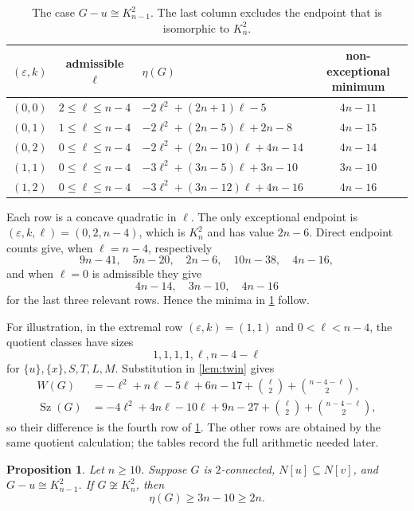 \documentclass[11pt,reqno]{amsart}
\newtheorem{proposition}[proposition]{Proposition}
\theoremstyle{definition}
\theoremstyle{remark}
\newcommand{\Sz}{\operatorname{Sz}}
\begin{document}
\begin{table}[H]
\centering
\caption{The case $G-u\cong K_{n-1}^2$.  The last column excludes the endpoint
that is isomorphic to $K_n^2$.}\label{tab:k2}
\small
\begin{tabular}{@{}c c l c@{}}
\toprule
$(\varepsilon,k)$ & admissible $\ell$ & $\eta(G)$ & non-exceptional minimum \\
\midrule
$(0,0)$ & $2\le\ell\le n-4$
& $-2\ell^2+(2n+1)\ell-5$ & $4n-11$ \\
$(0,1)$ & $1\le\ell\le n-4$
& $-2\ell^2+(2n-5)\ell+2n-8$ & $4n-15$ \\
$(0,2)$ & $0\le\ell\le n-4$
& $-2\ell^2+(2n-10)\ell+4n-14$ & $4n-14$ \\
$(1,1)$ & $0\le\ell\le n-4$
& $-3\ell^2+(3n-5)\ell+3n-10$ & $3n-10$ \\
$(1,2)$ & $0\le\ell\le n-4$
& $-3\ell^2+(3n-12)\ell+4n-16$ & $4n-16$ \\
\bottomrule
\end{tabular}
\end{table}

Each row is a concave quadratic in $\ell$.  The only exceptional endpoint is
$(\varepsilon,k,\ell)=(0,2,n-4)$, which is $K_n^2$ and has value $2n-6$.
Direct endpoint counts give, when $\ell=n-4$, respectively
\[
 9n-41,\quad 5n-20,\quad 2n-6,\quad 10n-38,\quad 4n-16,
\]
and when $\ell=0$ is admissible they give
\[
 4n-14,\quad 3n-10,\quad 4n-16
\]
for the last three relevant rows.  Hence the minima in \cref{tab:k2} follow.

For illustration, in the extremal row $(\varepsilon,k)=(1,1)$ and
$0<\ell<n-4$, the quotient classes have sizes
\[
  1,1,1,1,\ell,n-4-\ell
\]
for $\{u\},\{x\},S,T,L,M$.  Substitution in \cref{lem:twin} gives
\begin{align*}
 W(G)&=-\ell^2+n\ell-5\ell+6n-17
       +\binom{\ell}{2}+\binom{n-4-\ell}{2},\\
 \Sz(G)&=-4\ell^2+4n\ell-10\ell+9n-27
       +\binom{\ell}{2}+\binom{n-4-\ell}{2},
\end{align*}
so their difference is the fourth row of \cref{tab:k2}.  The other rows are
obtained by the same quotient calculation; the tables record the full
arithmetic needed later.

\begin{proposition}\label{prop:k2extension}
Let $n\ge10$.  Suppose $G$ is $2$-connected, $N[u]\subseteq N[v]$, and
$G-u\cong K_{n-1}^2$.  If $G\not\cong K_n^2$, then
\[
  \eta(G)\ge 3n-10\ge2n.
\]
\end{proposition}
\end{document}
